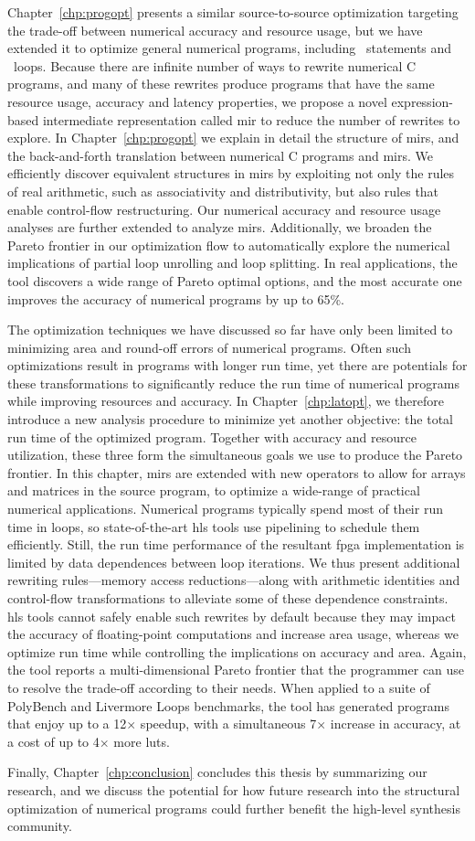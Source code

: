 Chapter~\ref{chp:progopt} presents a similar source-to-source optimization
targeting the trade-off between numerical accuracy and resource usage,
but we have extended it to optimize general numerical programs, including
\iflit~statements and \whilelit~loops.  Because there are infinite number
of ways to rewrite numerical C programs, and many of these rewrites produce
programs that have the same resource usage, accuracy and latency properties, we
propose a novel expression-based intermediate representation called \gls{mir}
to reduce the number of rewrites to explore.  In Chapter~\ref{chp:progopt}
we explain in detail the structure of \glspl{mir}, and the back-and-forth
translation between numerical C programs and \glspl{mir}.  We efficiently
discover equivalent structures in \glspl{mir} by exploiting not only the rules
of real arithmetic, such as associativity and distributivity, but also rules
that enable control-flow restructuring.  Our numerical accuracy and resource
usage analyses are further extended to analyze \glspl{mir}.  Additionally, we
broaden the Pareto frontier in our optimization flow to automatically explore
the numerical implications of partial loop unrolling and loop splitting.  In
real applications, the tool discovers a wide range of Pareto optimal options,
and the most accurate one improves the accuracy of numerical programs by up to
65\%.

The optimization techniques we have discussed so far have only been limited
to minimizing area and round-off errors of numerical programs.  Often such
optimizations result in programs with longer run time, yet there are potentials
for these transformations to significantly reduce the run time of numerical
programs while improving resources and accuracy.  In Chapter~\ref{chp:latopt},
we therefore introduce a new analysis procedure to minimize yet another
objective: the total run time of the optimized program.  Together with accuracy
and resource utilization, these three form the simultaneous goals we use
to produce the Pareto frontier.  In this chapter, \glspl{mir} are extended
with new operators to allow for arrays and matrices in the source program,
to optimize a wide-range of practical numerical applications.  Numerical
programs typically spend most of their run time in loops, so state-of-the-art
\gls{hls} tools use pipelining to schedule them efficiently.  Still, the run
time performance of the resultant \gls{fpga} implementation is limited by data
dependences between loop iterations.  We thus present additional rewriting
rules---memory access reductions---along with arithmetic identities and
control-flow transformations to alleviate some of these dependence constraints.
\gls{hls} tools cannot safely enable such rewrites by default because they may
impact the accuracy of floating-point computations and increase area usage,
whereas we optimize run time while controlling the implications on accuracy and
area.  Again, the tool reports a multi-dimensional Pareto frontier that the
programmer can use to resolve the trade-off according to their needs.  When
applied to a suite of PolyBench and Livermore Loops benchmarks, the tool has
generated programs that enjoy up to a 12$\times$ speedup, with a simultaneous
7$\times$ increase in accuracy, at a cost of up to 4$\times$ more \glspl{lut}.

Finally, Chapter~\ref{chp:conclusion} concludes this thesis by summarizing
our research, and we discuss the potential for how future research into the
structural optimization of numerical programs could further benefit the
high-level synthesis community.
